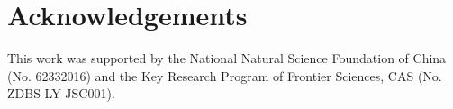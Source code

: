 \section*{Acknowledgements}
This work was supported by the National Natural Science Foundation of China (No. 62332016) and the Key Research Program of Frontier Sciences, CAS (No. ZDBS-LY-JSC001).
